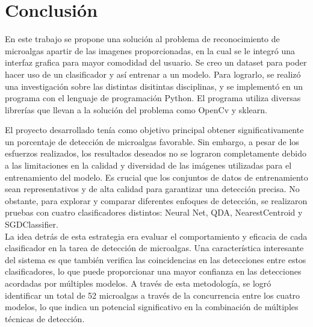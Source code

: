 \documentclass[conference]{IEEEtran}
\begin{document}
\section{Conclusión}

En este trabajo se propone una solución al problema de reconocimiento de microalgas apartir de las imagenes proporcionadas, en la cual se le integró una interfaz grafica para mayor comodidad del usuario. Se creo un dataset para poder hacer uso de un clasificador y así entrenar a un modelo. Para lograrlo, se realizó una investigación sobre las distintas disitintas disciplinas, y se implementó en un programa con el lenguaje de programación Python.  El programa utiliza diversas librerías que llevan a la solución del problema como OpenCv y sklearn.

El proyecto desarrollado tenía como objetivo principal obtener significativamente un porcentaje de detección de microalgas favorable. Sin embargo, a pesar de los esfuerzos realizados, los resultados deseados no se lograron completamente debido a las limitaciones en la calidad y diversidad de las imágenes utilizadas para el entrenamiento del modelo. Es crucial que los conjuntos de datos de entrenamiento sean representativos y de alta calidad para garantizar una detección precisa. No obstante, para explorar y comparar diferentes enfoques de detección, se realizaron pruebas con cuatro clasificadores distintos: Neural Net, QDA, NearestCentroid y SGDClassifier.\\
La idea detrás de esta estrategia era evaluar el comportamiento y eficacia de cada clasificador en la tarea de detección de microalgas. Una característica interesante del sistema es que también verifica las coincidencias en las detecciones entre estos clasificadores, lo que puede proporcionar una mayor confianza en las detecciones acordadas por múltiples modelos. A través de esta metodología, se logró identificar un total de 52 microalgas a través de la concurrencia entre los cuatro modelos, lo que indica un potencial significativo en la combinación de múltiples técnicas de detección.

\printbibliography
\end{document}
